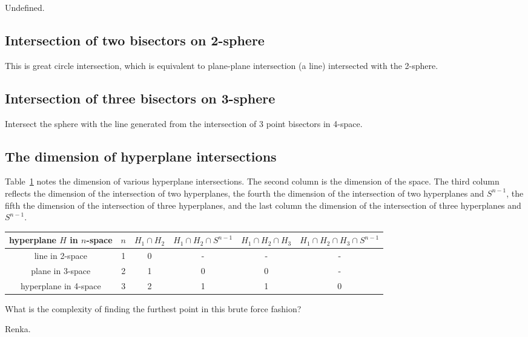 \documentclass[12pt]{article}
\begin{document}
Undefined.

\subsection{Intersection of two bisectors on 2-sphere}

This is great circle intersection, which is equivalent to 
plane-plane intersection (a line) intersected with the 2-sphere.

\subsection{Intersection of three bisectors on 3-sphere}

Intersect the sphere with the 
line generated from the intersection of 3 point bisectors in 4-space.

\subsection{The dimension of hyperplane intersections}

Table~\ref{tab:dim} notes the dimension of various hyperplane intersections.
The second column is the dimension of the space.
The third column reflects the dimension of the intersection of two hyperplanes,
the fourth the dimension of the intersection of two hyperplanes and $S^{n-1}$,
the fifth the dimension of the intersection of three hyperplanes, 
and the last column the dimension of the intersection of three hyperplanes and $S^{n-1}$.

\begin{table}
\label{tab:dim}
\begin{tabular}{c|c|c|c|c|c}
hyperplane $H$ in $n$-space & $n$ & $H_1 \cap H_2$ & $H_1 \cap H_2 \cap S^{n-1}$ & $H_1 \cap H_2 \cap H_3$ & $H_1 \cap H_2 \cap H_3 \cap S^{n-1}$ \\ \hline
line in 2-space       & 1 & 0 & - & - & - \\
plane in 3-space      & 2 & 1 & 0 & 0 & - \\
hyperplane in 4-space & 3 & 2 & 1 & 1 & 0
\end{tabular}
\end{table}

What is the complexity of finding the furthest point in this brute force fashion? 


\begin{thebibliography}{99}

Renka.

\end{thebibliography}
\end{document}
